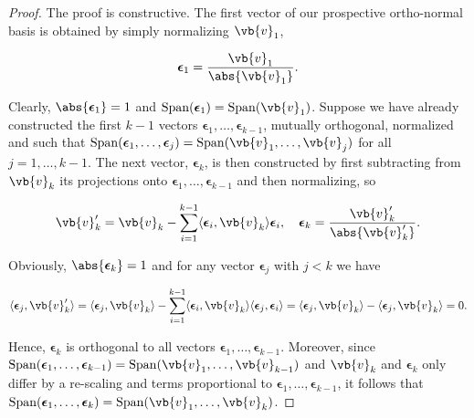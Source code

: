\documentclass[a4paper,12pt]{report}
\begin{document}
\begin{proof}
The proof is constructive. The first vector of our prospective ortho-normal basis is obtained by simply normalizing \(\vb{v} _{1} \), \ie

\begin{equation}
    \boldsymbol{\epsilon }_{1} = \frac{\vb{v} _{1} }{\abs{\vb{v} _{1} } }.   
\end{equation}

Clearly, \(\abs{\boldsymbol{\epsilon}_1} = 1\) and \(\operatorname{Span}(\boldsymbol{\epsilon}_1) = \operatorname{Span}(\vb{v}_1)\). Suppose we have already constructed the first \(k - 1\) vectors \(\boldsymbol{\epsilon}_1, \ldots, \boldsymbol{\epsilon}_{k-1}\), mutually orthogonal, normalized and such that \(\operatorname{Span}(\boldsymbol{\epsilon}_1, \ldots, \boldsymbol{\epsilon}_j) = \operatorname{Span}(\vb{v}_1, \ldots, \vb{v}_j)\) for all \(j = 1, \ldots, k - 1\). The next vector, \(\boldsymbol{\epsilon}_k\), is then constructed by first subtracting from \(\vb{v}_k\) its projections onto \(\boldsymbol{\epsilon}_1, \ldots, \boldsymbol{\epsilon}_{k-1}\) and then normalizing, so

\begin{equation}
\vb{v}'_k = \vb{v}_k - \sum_{i=1}^{k-1} \langle \boldsymbol{\epsilon}_i, \vb{v}_k \rangle \boldsymbol{\epsilon}_i, \quad \boldsymbol{\epsilon}_k = \frac{\vb{v}'_k}{\abs{\vb{v}'_k}}.
\end{equation}

Obviously, \(\abs{\boldsymbol{\epsilon}_k} = 1\) and for any vector \(\boldsymbol{\epsilon}_j\) with \(j < k\) we have

\begin{equation}
\langle \boldsymbol{\epsilon}_j, \vb{v}'_k \rangle = \langle \boldsymbol{\epsilon}_j, \vb{v}_k \rangle - \sum_{i=1}^{k-1} \langle \boldsymbol{\epsilon}_i, \vb{v}_k \rangle \langle \boldsymbol{\epsilon}_j, \boldsymbol{\epsilon}_i \rangle = \langle \boldsymbol{\epsilon}_j, \vb{v}_k \rangle - \langle \boldsymbol{\epsilon}_j, \vb{v}_k \rangle = 0.
\end{equation}

Hence, \(\boldsymbol{\epsilon}_k\) is orthogonal to all vectors \(\boldsymbol{\epsilon}_1, \ldots, \boldsymbol{\epsilon}_{k-1}\). Moreover, since \(\operatorname{Span}(\boldsymbol{\epsilon}_1, \ldots, \boldsymbol{\epsilon}_{k-1}) = \operatorname{Span}(\vb{v}_1, \ldots, \vb{v}_{k-1})\) and \(\vb{v}_k\) and \(\boldsymbol{\epsilon}_k\) only differ by a re-scaling and terms proportional to \(\boldsymbol{\epsilon}_1, \ldots, \boldsymbol{\epsilon}_{k-1}\), it follows that \(\operatorname{Span}(\boldsymbol{\epsilon}_1, \ldots, \boldsymbol{\epsilon}_k) = \operatorname{Span}(\vb{v}_1, \ldots, \vb{v}_k)\). 


\end{proof}
\end{document}
